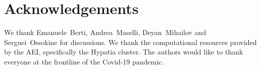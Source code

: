 \documentclass[twocolumn,prd,aps,superscriptaddress,preprintnumbers,tightenlines,showpacs,nofootinbib,eqsecnum,amsfonts,amsmath,longbibliography]{revtex4-2}
\begin{document}
\section*{Acknowledgements}
\label{sec:acknowledgements}
%
We thank Emanuele~Berti, Andrea~Maselli, Deyan~Mihailov and Serguei~Ossokine
for discussions.
%
We thank the computational resources provided by the AEI, specifically the
{\sc Hypatia} cluster.
%
The authors would like to thank everyone at the frontline of the Covid-19
pandemic.

% 

\end{document}
